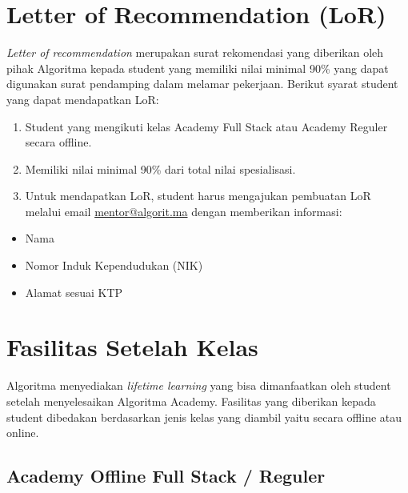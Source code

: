 \documentclass[
]{book}
\providecommand{\tightlist}{%
  \setlength{\itemsep}{0pt}\setlength{\parskip}{0pt}}
\begin{document}
\hypertarget{letter-of-recommendation-lor}{%
\section{Letter of Recommendation (LoR)}\label{letter-of-recommendation-lor}}

\emph{Letter of recommendation} merupakan surat rekomendasi yang diberikan oleh pihak Algoritma kepada student yang memiliki nilai minimal 90\% yang dapat digunakan surat pendamping dalam melamar pekerjaan. Berikut syarat student yang dapat mendapatkan LoR:

\begin{enumerate}
\def\labelenumi{\arabic{enumi}.}
\tightlist
\item
  Student yang mengikuti kelas Academy Full Stack atau Academy Reguler secara offline.
\item
  Memiliki nilai minimal 90\% dari total nilai spesialisasi.
\item
  Untuk mendapatkan LoR, student harus mengajukan pembuatan LoR melalui email \url{mentor@algorit.ma} dengan memberikan informasi:
\end{enumerate}

\begin{itemize}
\tightlist
\item
  Nama
\item
  Nomor Induk Kependudukan (NIK)
\item
  Alamat sesuai KTP
\end{itemize}

\hypertarget{fasilitas-setelah-kelas}{%
\section{Fasilitas Setelah Kelas}\label{fasilitas-setelah-kelas}}

Algoritma menyediakan \emph{lifetime learning} yang bisa dimanfaatkan oleh student setelah menyelesaikan Algoritma Academy. Fasilitas yang diberikan kepada student dibedakan berdasarkan jenis kelas yang diambil yaitu secara offline atau online.

\hypertarget{academy-offline-full-stack-reguler}{%
\subsection{Academy Offline Full Stack / Reguler}\label{academy-offline-full-stack-reguler}}
\end{document}
